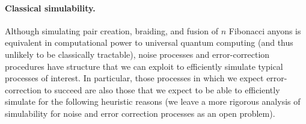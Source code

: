 \documentclass[aps, prl, letterpaper, twocolumn, superscriptaddress, notitlepage, 10pt]{revtex4-1}
\newcommand{\stf}[1]{\textcolor{green}{#1}}
\begin{document}

\paragraph{Classical simulability.}

Although simulating pair creation, braiding, and fusion of $n$ Fibonacci anyons is equivalent 
in computational power to universal quantum computing (and thus unlikely to be classically 
tractable), noise processes and error-correction procedures have structure that we can 
exploit to efficiently simulate typical processes of interest. In particular, those 
processes in which we expect error-correction to succeed are also those that we expect to 
be able to efficiently simulate for the following heuristic reasons (we leave a more rigorous analysis of simulability for noise and error correction processes as an open problem).
\end{document}
